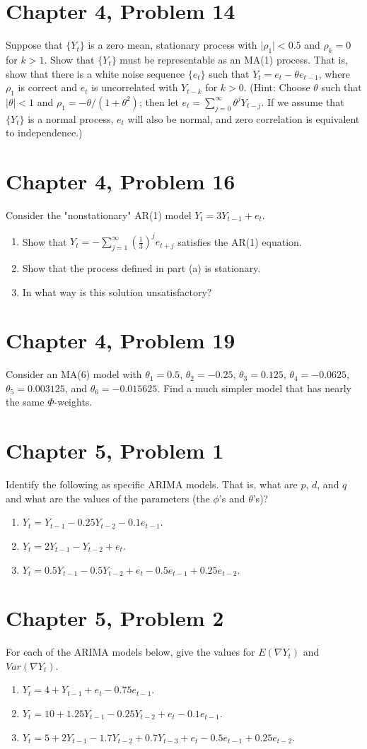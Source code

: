 \documentclass[11pt]{article}
\newif\ifclearpage
\newcommand{\problem}[1]{\section*{#1}}
\newcommand{\solution}{\hrulefill}
\newcommand{\maybeclearpage}{\ifclearpage\clearpage\fi}
\begin{document}
\problem{Chapter 4, Problem 14}
Suppose that $\{Y_t\}$ is a zero mean, stationary process with $\mid \rho_1 \mid < 0.5$ and $\rho_k = 0$ for $k > 1$. Show that $\{Y_t\}$ must be representable as an MA(1) process. That is, show that there is a white noise sequence $\{e_t\}$ such that $Y_t = e_t - \theta e_{t-1}$, where $\rho_1$ is correct and $e_t$ is uncorrelated with $Y_{t-k}$ for $k > 0$. (Hint: Choose $\theta$ such that $\mid \theta \mid < 1$ and $\rho_1 = -\theta/(1+\theta^2)$; then let $e_t = \sum_{j=0}^{\infty} \theta^jY_{t-j}$. If we assume that $\{Y_t\}$ is a normal process, $e_t$ will also be normal, and zero correlation is equivalent to independence.)

\solution


\maybeclearpage
\problem{Chapter 4, Problem 16}
Consider the "nonstationary" AR(1) model $Y_t = 3Y_{t-1} + e_t$.
\begin{enumerate}
	\item Show that $Y_t = - \sum_{j=1}^{\infty} \left( \frac{1}{3} \right)^j e_{t+j}$ satisfies the AR(1) equation.
	\item Show that the process defined in part (a) is stationary.
	\item In what way is this solution unsatisfactory?
\end{enumerate}

\solution



\maybeclearpage
\problem{Chapter 4, Problem 19}
Consider an MA(6) model with $\theta_1 = 0.5$, $\theta_2 = -0.25$, $\theta_3 = 0.125$, $\theta_4 = -0.0625$, $\theta_5 = 0.003125$, and $\theta_6 = -0.015625$. Find a much simpler model that has nearly the same $\Phi$-weights.
\solution


\maybeclearpage
\problem{Chapter 5, Problem 1}
Identify the following as specific ARIMA models. That is, what are $p$, $d$, and $q$ and what are the values of the parameters (the $\phi$'s and $\theta$'s)?
\begin{enumerate}
	\item $Y_t = Y_{t-1} - 0.25Y_{t-2} - 0.1e_{t-1}$.
	\item $Y_t = 2Y_{t-1} - Y_{t-2} + e_t$.
	\item $Y_t = 0.5Y_{t-1} - 0.5Y_{t-2} + e_t - 0.5e_{t-1} + 0.25e_{t-2}$.
\end{enumerate}

\solution


\maybeclearpage
\problem{Chapter 5, Problem 2}
For each of the ARIMA models below, give the values for $E(\nabla Y_t)$ and $Var(\nabla Y_t)$.
\begin{enumerate}
	\item $Y_t = 4 + Y_{t-1} + e_t - 0.75e_{t-1}$.
	\item $Y_t = 10 + 1.25Y_{t-1} - 0.25Y_{t-2} + e_t - 0.1e_{t-1}$.
	\item $Y_t = 5 + 2Y_{t-1} - 1.7Y_{t-2} + 0.7Y_{t-3} + e_t - 0.5e_{t-1} + 0.25e_{t-2}$.
\end{enumerate}
\end{document}
